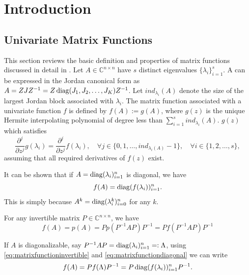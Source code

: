 \section{Introduction}

\subsection{Univariate Matrix Functions}
This section reviews the basic definition and properties of matrix functions discussed in detail in
\cite{higham2008functions}.
Let $A \in \mathbb{C}^{n \times n}$ have $s$ distinct eigenvalues $\{\lambda_i\}_{i=1}^{s}$. A can be
expressed in the Jordan canonical form as $A = ZJZ^{-1} = Z \operatorname{diag}(J_1, J_2, \dots, J_K) Z^{-1}$. Let
$ind_{\lambda_i}(A)$ denote the size of the largest Jordan block associated with $\lambda_i$. The matrix
function associated with a univariate function $f$ is defined by $f(A) := g(A)$, where $g(z)$ is the unique
Hermite interpolating polynomial of degree less than $\sum_{i=1}^{s}{ind_{\lambda_i}(A)}$. $g(z)$ which
satisfies
\begin{equation}
    \frac{\partial^j}{\partial z^j}g(\lambda_i) = \frac{\partial^j}{\partial z^j}f(\lambda_i),
    \quad \forall j \in \{0, 1, \dots, ind_{\lambda_i(A)}-1\},
    \quad \forall i \in \{1, 2, \dots, s\},
\end{equation}
assuming that all required derivatives of $f(z)$ exist.

It can be shown that if $A = \operatorname{diag}(\lambda_i)_{i=1}^{n}$ is diagonal, we have
\begin{equation}
    \label{eq:matrixfunctiondiagonal}
    f(A) = \operatorname{diag}(f(\lambda_i))_{i=1}^{n}.
\end{equation}
This is simply because $A^k = \operatorname{diag}(\lambda_i^k)_{i=0}^{n}$ for any $k$.

For any invertible matrix $P \in \mathbb{C}^{n \times n}$, we have
\begin{equation}
    \label{eq:matrixfunctioninvertible}
    f(A) = p(A) = Pp(P^{-1}AP)P^{-1} = Pf(P^{-1}AP)P^{-1}
\end{equation}

If $A$ is diagonalizable, say $P^{-1}AP = \operatorname{diag}(\lambda_i)_{i=1}^{n} =: \Lambda$,
using \eqref{eq:matrixfunctioninvertible} and \eqref{eq:matrixfunctiondiagonal}
we can write
\begin{equation}
    f(A) = P f(\Lambda) P^{-1} = P \operatorname{diag}(f(\lambda_i))_{i=1}^{n} P^{-1}.
\end{equation}

